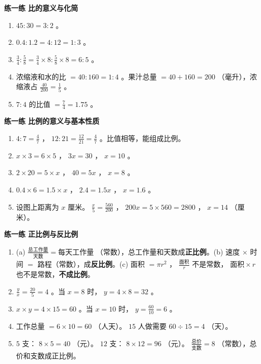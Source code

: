 \begin{answer}


\textbf{练一练 比的意义与化简}

\begin{enumerate}
  \item $45 : 30 = 3 : 2$ 。
  \item $0.4 : 1.2 = 4 : 12 = 1 : 3$ 。
  \item $\frac{3}{4} : \frac{5}{8} = \frac{3}{4} \times 8 : \frac{5}{8} \times 8 = 6 : 5$ 。
  \item 浓缩液和水的比 $= 40 : 160 = 1 : 4$ 。果汁总量 $= 40 + 160 = 200$ （毫升），浓缩液占 $\frac{40}{200} = \frac{1}{5}$ 。
  \item $7 : 4$ 的比值 $= \frac{7}{4} = 1.75$ 。
\end{enumerate}


\textbf{练一练 比例的意义与基本性质}

\begin{enumerate}
  \item $4 : 7 = \frac{4}{7}$ ， $12 : 21 = \frac{12}{21} = \frac{4}{7}$ 。比值相等，能组成比例。
  \item $x \times 3 = 6 \times 5$ ， $3x = 30$ ， $x = 10$ 。
  \item $2 \times 20 = 5 \times x$ ， $40 = 5x$ ， $x = 8$ 。
  \item $0.4 \times 6 = 1.5 \times x$ ， $2.4 = 1.5x$ ， $x = 1.6$ 。
  \item 设图上距离为 $x$ 厘米。 $\frac{x}{5} = \frac{560}{200}$ ， $200x = 5 \times 560 = 2800$ ， $x = 14$ （厘米）。
\end{enumerate}


\textbf{练一练 正比例与反比例}

\begin{enumerate}
  \item (a) $\frac{\text{总工作量}}{\text{天数}} = \text{每天工作量}$ （常数），总工作量和天数成\textbf{正比例}。(b) 速度 $\times$ 时间 $=$ 路程（常数），成\textbf{反比例}。(c) 面积 $= \pi r^2$ ， $\frac{\text{面积}}{r}$ 不是常数， $\text{面积} \times r$ 也不是常数，\textbf{不成比例}。
  \item $\frac{y}{x} = \frac{20}{5} = 4$ 。当 $x = 8$ 时， $y = 4 \times 8 = 32$ 。
  \item $x \times y = 4 \times 15 = 60$ 。当 $x = 10$ 时， $y = \frac{60}{10} = 6$ 。
  \item 工作总量 $= 6 \times 10 = 60$ （人天）。 $15$ 人做需要 $60 \div 15 = 4$ （天）。
  \item $5$ 支： $8 \times 5 = 40$ （元）。 $12$ 支： $8 \times 12 = 96$ （元）。 $\frac{\text{总价}}{\text{支数}} = 8$ （常数），总价和支数成正比例。
\end{enumerate}



\end{answer}
